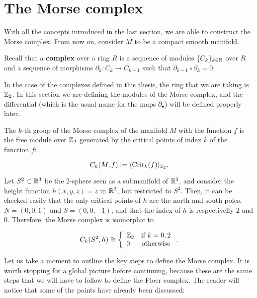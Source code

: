 \section{The Morse complex} \label{section:morse_complex}

With all the concepts introduced in the last section, we are able to construct the Morse complex. From now on, consider $M$ to be a compact smooth manifold.

\begin{deff}
Recall that a {\bf complex} over a ring $R$ is a sequence of modules $\{ C_k \}_{k \in \mathbb{N}}$ over $R$ and a sequence of morphisms $\partial_k : C_k \rightarrow C_{k-1}$ such that $\partial_{k-1} \circ \partial_k = 0$.
\end{deff}

In the case of the complexes defined in this thesis, the ring that we are taking is $\mathbb{Z}_2$. In this section we are defining the modules of the Morse complex, and the differential (which is the usual name for the maps $\partial_{\bullet}$) will be defined properly later.

\begin{deff}
The $k$-th group of the Morse complex of the manifold $M$ with the function $f$ is the free module over $\mathbb{Z}_2$ generated by the critical points of index $k$ of the function $f$:

\begin{displaymath}
C_k(M,f) := \langle \text{Crit}_k(f) \rangle_{\mathbb{Z}_2} .
\end{displaymath}
\end{deff}

\begin{exmpl}
Let $S^2 \subset \mathbb{R}^3$ be the 2-sphere seen as a submanifold of $\mathbb{R}^3$, and consider the height function $h(x,y,z) = z$ in $\mathbb{R}^3$, but restricted to $S^2$. Then, it can be checked easily that the only critical points of $h$ are the north and south poles, $N = (0,0,1)$ and $S = (0,0,-1)$, and that the index of $h$ is respectivelly $2$ and $0$. Therefore, the Morse complex is isomorphic to

$$C_k(S^2,h) \cong \left\{ \begin{array}{lc} \mathbb{Z}_2 & \text{if } k = 0, 2 \\ 0 & \text{otherwise} \end{array}\right. .$$
\end{exmpl}

Let us take a moment to outline the key steps to define the Morse complex. It is worth stopping for a global picture before continuing, because these are the same steps that we will have to follow to define the Floer complex. The reader will notice that some of the points have already been discussed:

